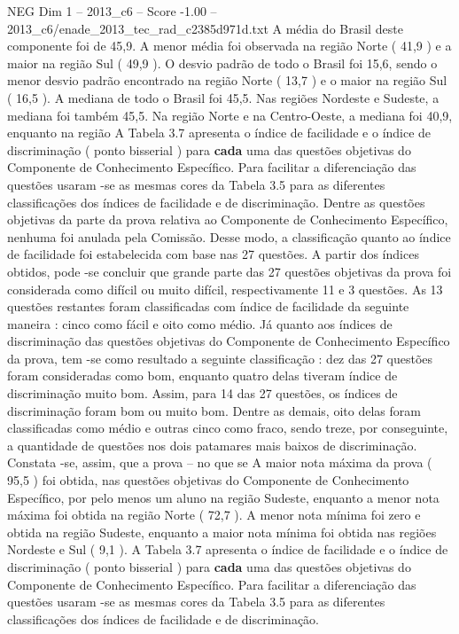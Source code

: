 \begin{textsample}{NEG Dim 1 – 2013\_c6 – Score -1.00 – 2013\_c6/enade\_2013\_tec\_rad\_c2385d971d.txt}
A média do Brasil deste componente foi de 45,9.
A menor média foi observada na região Norte ( 41,9 ) e a maior na região Sul ( 49,9 ).
O desvio padrão de todo o Brasil foi 15,6, sendo o menor desvio padrão encontrado na região Norte ( 13,7 ) e o maior na região Sul ( 16,5 ).
A mediana de todo o Brasil foi 45,5.
Nas regiões Nordeste e Sudeste, a mediana foi também 45,5.
Na região Norte e na Centro-Oeste, a mediana foi 40,9, enquanto na região A Tabela 3.7 apresenta o índice de facilidade e o índice de discriminação ( ponto bisserial ) para \textbf{cada} uma das questões objetivas do Componente de Conhecimento Específico.
Para facilitar a diferenciação das questões usaram -se as mesmas cores da Tabela 3.5 para as diferentes classificações dos índices de facilidade e de discriminação.
Dentre as questões objetivas da parte da prova relativa ao Componente de Conhecimento Específico, nenhuma foi anulada pela Comissão.
Desse modo, a classificação quanto ao índice de facilidade foi estabelecida com base nas 27 questões.
A partir dos índices obtidos, pode -se concluir que grande parte das 27 questões objetivas da prova foi considerada como difícil ou muito difícil, respectivamente 11 e 3 questões.
As 13 questões restantes foram classificadas com índice de facilidade da seguinte maneira : cinco como fácil e oito como médio.
Já quanto aos índices de discriminação das questões objetivas do Componente de Conhecimento Específico da prova, tem -se como resultado a seguinte classificação : dez das 27 questões foram consideradas como bom, enquanto quatro delas tiveram índice de discriminação muito bom.
Assim, para 14 das 27 questões, os índices de discriminação foram bom ou muito bom.
Dentre as demais, oito delas foram classificadas como médio e outras cinco como fraco, sendo treze, por conseguinte, a quantidade de questões nos dois patamares mais baixos de discriminação.
Constata -se, assim, que a prova – no que se A maior nota máxima da prova ( 95,5 ) foi obtida, nas questões objetivas do Componente de Conhecimento Específico, por pelo menos um aluno na região Sudeste, enquanto a menor nota máxima foi obtida na região Norte ( 72,7 ).
A menor nota mínima foi zero e obtida na região Sudeste, enquanto a maior nota mínima foi obtida nas regiões Nordeste e Sul ( 9,1 ).
A Tabela 3.7 apresenta o índice de facilidade e o índice de discriminação ( ponto bisserial ) para \textbf{cada} uma das questões objetivas do Componente de Conhecimento Específico.
Para facilitar a diferenciação das questões usaram -se as mesmas cores da Tabela 3.5 para as diferentes classificações dos índices de facilidade e de discriminação.

\end{textsample}
